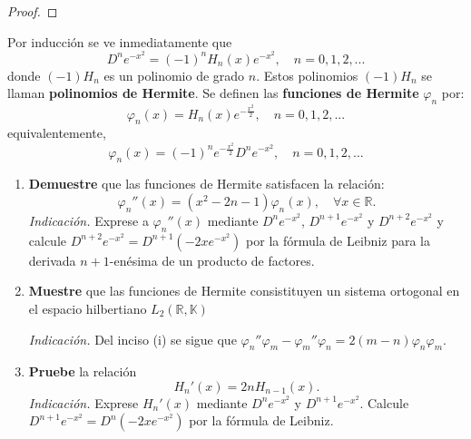 \documentclass[12pt]{report}
\theoremstyle{largebreak}
\begin{document}
    \begin{proof}
        
    \end{proof}

    \begin{excer}
        Por inducción se ve inmediatamente que
        \begin{equation*}
            D^ne^{-x^2}=(-1)^nH_n(x)e^{-x^2}, \quad n=0,1,2,...
        \end{equation*}
        donde $(-1)H_n$ es un polinomio de grado $n$. Estos polinomios $(-1)H_n$ se llaman \textbf{polinomios de Hermite}. Se definen las \textbf{funciones de Hermite} $\varphi_n$ por:
        \begin{equation*}
            \varphi_n(x)=H_n(x)e^{-\frac{x^2}{2}},\quad n=0,1,2,...
        \end{equation*}
        equivalentemente,
        \begin{equation*}
            \varphi_n(x)=(-1)^ne^{-\frac{x^2}{2}}D^ne^{-x^2},\quad n=0,1,2,...
        \end{equation*}
        \begin{enumerate}
            \item \textbf{Demuestre} que las funciones de Hermite satisfacen la relación:
            \begin{equation*}
                \varphi_n''(x)=(x^2-2n-1)\varphi_n(x),\quad\forall x\in\mathbb{R}.
            \end{equation*}
            \textit{Indicación.} Exprese a $\varphi_n''(x)$ mediante $D^ne^{-x^2}$, $D^{n+1}e^{-x^2}$ y $D^{n+2}e^{-x^2}$ y calcule $D^{n+2}e^{-x^2}=D^{n+1}(-2xe^{-x^2})$ por la fórmula de Leibniz para la derivada $n+1$-enésima de un producto de factores.

            \item \textbf{Muestre} que las funciones de Hermite consistituyen un sistema ortogonal en el espacio hilbertiano $L_2(\mathbb{R},\mathbb{K})$
            
            \textit{Indicación.} Del inciso (i) se sigue que $\varphi_n''\varphi_m-\varphi_m''\varphi_n=2(m-n)\varphi_n\varphi_m$.

            \item \textbf{Pruebe} la relación
            \begin{equation*}
                H_n'(x)=2nH_{n-1}(x).
            \end{equation*}
            \textit{Indicación.} Exprese $H_n'(x)$ mediante $D^ne^{-x^2}$ y $D^{n+1}e^{-x^2}$. Calcule $D^{n+1}e^{-x^2}=D^n(-2xe^{-x^2})$ por la fórmula de Leibniz.


\end{enumerate}
\end{excer}
\end{document}
